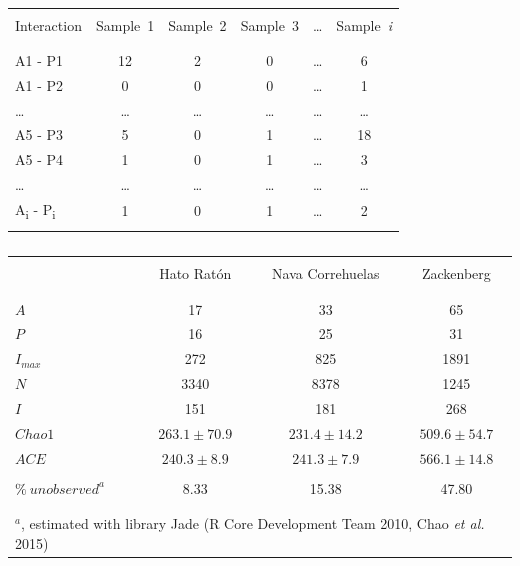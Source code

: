 \documentclass[12pt]{article}
\begin{document}
%
\newpage
\begin{table}[ht!]
  \caption{}
  \label{Table_3}
  \begin{center}
    \begin{tabular}{lccccc}
      \hline
\\Interaction&Sample\ 1&Sample\ 2&Sample\ 3&{\ldots}&Sample\ \emph{i}\\\\
      \hline
\\A1 - P1&12&2&0&{\ldots}&6\\
A1 - P2&0&0&0&{\ldots}&1\\
{\ldots}&{\ldots}&{\ldots}&{\ldots}&{\ldots}&{\ldots}\\
A5 - P3&5&0&1&{\ldots}&18\\
A5 - P4&1&0&1&{\ldots}&3\\
{\ldots}&{\ldots}&{\ldots}&{\ldots}&{\ldots}&{\ldots}\\
A\textsubscript{i} - P\textsubscript{i}&1&0&1&{\ldots}&2\\\\
      \hline
    \end{tabular}
  \end{center}
\end{table}
%
\newpage
\begin{table}[ht!]
  \caption{}
  \label{Table_4}
  \begin{center}
    \begin{tabular}{lccc}
      \hline
\\       &Hato Rat\'on  &  Nava Correhuelas&    Zackenberg\\\\
      \hline             
\\$A$&17&33&65\\
$P$&16&25&31\\
$I_{max}$&272&825&1891\\
$N$&3340&8378&1245\\
$I$&151&181&268\\
$Chao1$&$263.1\pm70.9$&$231.4\pm14.2$&$509.6\pm54.7$\\
$ACE$&$240.3\pm8.9$&$241.3\pm7.9$&$566.1\pm14.8$\\\\
$\%\ unobserved^a$&8.33&15.38&47.80\\\\
      \hline
\\\multicolumn{4}{l}{$^a$, estimated with library Jade (R Core Development Team 2010, Chao \emph{et al.} 2015)}\\
    \end{tabular}
  \end{center}
\end{table}
\end{document}
